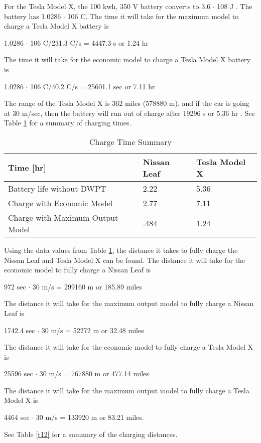 For the Tesla Model X, the 100 kwh, 350 V battery converts to 3.6 $\cdot$ 108 J \cite{noauthor_model_nodate}. The battery has 
1.0286 $\cdot$ 106 C. The time it will take for the maximum model to charge a Tesla Model X battery is 
\begin{center}
    1.0286 $\cdot$ 106 C/231.3 C/s = 4447.3 s or 1.24 hr
\end{center}
The time it will take for the economic model to charge a Tesla Model X battery is
\begin{center}
    1.0286 $\cdot$ 106 C/40.2 C/s = 25601.1 sec or 7.11 hr
\end{center}
The range of the Tesla Model X is 362 miles (578880 m), and if the car is going at 30 m/sec, then the battery 
will run out of charge after 19296 s or 5.36 hr \cite{noauthor_model_nodate}. See Table \ref{t11} for a summary of charging times.

\begin{table}[H]
    \caption[Charge Time Summary]{Charge Time Summary}
    \begin{center}
    \begin{tabular}{| p{} | p{} | p{} |}
    \hline
    Time [hr] & Nissan Leaf & Tesla Model X \\
    \hline \hline
    Battery life without DWPT & 2.22 & 5.36 \\
    \hline
    Charge with Economic Model & 2.77 & 7.11 \\
    \hline
    Charge with Maximum Output Model & .484 & 1.24 \\
    \hline
    \end{tabular}
    \end{center}
    \label{t11}
\end{table}

Using the data values from Table \ref{t11}, the distance it takes to fully charge the Nissan Leaf and Tesla Model X 
can be found. The distance it will take for the economic model to fully charge a Nissan Leaf is
\begin{center}
    972 sec $\cdot$ 30 m/s = 299160 m or 185.89 miles
\end{center}
The distance it will take for the maximum output model to fully charge a Nissan Leaf is
\begin{center}
    1742.4 sec $\cdot$ 30 m/s = 52272 m or 32.48 miles
\end{center}
The distance it will take for the economic model to fully charge a Tesla Model X is
\begin{center}
    25596 sec $\cdot$ 30 m/s = 767880 m or 477.14 miles
\end{center}
The distance it will take for the  maximum output model to fully charge a Tesla Model X is
\begin{center}
    4464 sec $\cdot$ 30 m/s = 133920 m or 83.21 miles.
\end{center}
See Table \ref{t12} for a summary of the charging distances.

